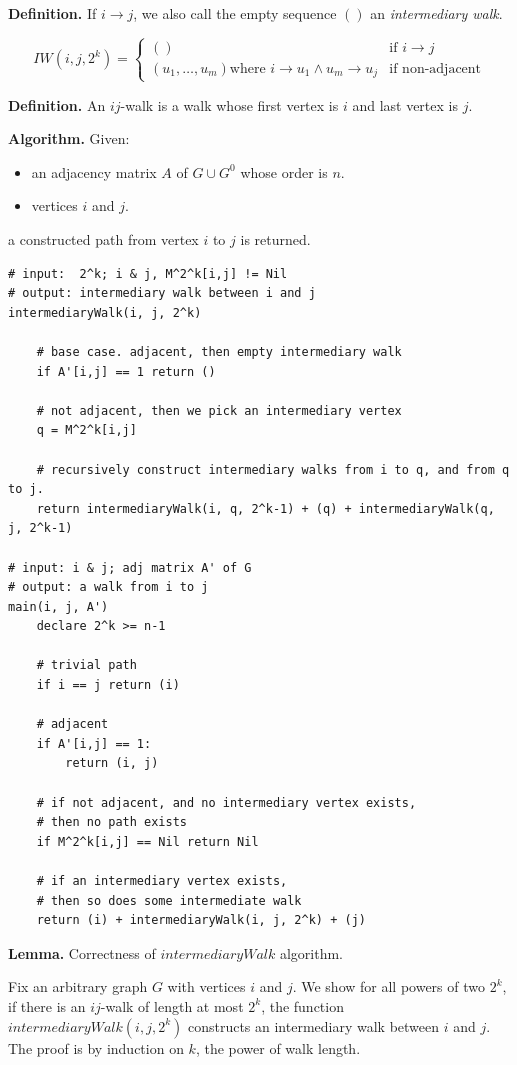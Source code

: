 \documentclass[pdflatex,sn-mathphys-num]{sn-jnl}%
\begin{document}
\textbf{Definition.} If $i \rightarrow j$, we also call the empty sequence $()$ an \textit{intermediary walk}.

$$
  IW(i,j,2^k) = \begin{cases} 
    () & \text{if } i \rightarrow j \\
    (u_1, \dots, u_m) \text{where } i \rightarrow u_1 \wedge u_m \rightarrow u_j & \text{if non-adjacent}
       \end{cases}
$$

\textbf{Definition.} An $ij$-walk is a walk whose first vertex is $i$ and last vertex is $j$.

\textbf{Algorithm.} Given:
\begin{itemize}
  \item an adjacency matrix $A$ of $G \cup G^0$ whose order is $n$.
  \item vertices $i$ and $j$.
\end{itemize}
a constructed path from vertex $i$ to $j$ is returned.

\begin{verbatim}
# input:  2^k; i & j, M^2^k[i,j] != Nil
# output: intermediary walk between i and j
intermediaryWalk(i, j, 2^k)

    # base case. adjacent, then empty intermediary walk
    if A'[i,j] == 1 return ()
    
    # not adjacent, then we pick an intermediary vertex
    q = M^2^k[i,j]
    
    # recursively construct intermediary walks from i to q, and from q to j.
    return intermediaryWalk(i, q, 2^k-1) + (q) + intermediaryWalk(q, j, 2^k-1)

# input: i & j; adj matrix A' of G
# output: a walk from i to j
main(i, j, A')
    declare 2^k >= n-1

    # trivial path
    if i == j return (i)

    # adjacent
    if A'[i,j] == 1:
        return (i, j)

    # if not adjacent, and no intermediary vertex exists,
    # then no path exists
    if M^2^k[i,j] == Nil return Nil

    # if an intermediary vertex exists,
    # then so does some intermediate walk
    return (i) + intermediaryWalk(i, j, 2^k) + (j)
\end{verbatim}

\textbf{Lemma.} Correctness of $intermediaryWalk$ algorithm.

Fix an arbitrary graph $G$ with vertices $i$ and $j$. We show for all powers of two $2^k$, if there is an $ij$-walk of length at most $2^k$, the function $intermediaryWalk(i,j,2^k)$ constructs an intermediary walk between $i$ and $j$. The proof is by induction on $k$, the power of walk length.
\end{document}
